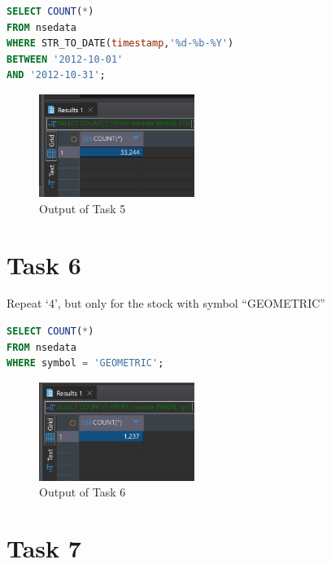 \documentclass{article}
\begin{document}
\begin{lstlisting}[language=SQL, caption=Counting the Total Number of Records for October 2012]
SELECT COUNT(*)
FROM nsedata
WHERE STR_TO_DATE(timestamp,'%d-%b-%Y')
BETWEEN '2012-10-01'
AND '2012-10-31';
\end{lstlisting}

\begin{figure}[H]
	\centering
	\includegraphics[width=0.45\textwidth]{Images/Task5.png}
	\caption{Output of Task 5}
\end{figure}

\section*{Task 6}

\begin{task*}[6]
Repeat `4', but only for the stock with symbol “GEOMETRIC”
\end{task*}

\begin{lstlisting}[language=SQL, caption=Counting the Total Number of Records for GEOMETRIC]
SELECT COUNT(*)
FROM nsedata
WHERE symbol = 'GEOMETRIC';
\end{lstlisting}

\begin{figure}[H]
	\centering
	\includegraphics[width=0.45\textwidth]{Images/Task6.png}
	\caption{Output of Task 6}
\end{figure}

\section*{Task 7}
\end{document}
